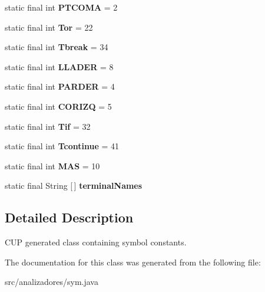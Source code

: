 \begin{DoxyCompactItemize}
static final int {\bfseries P\+T\+C\+O\+MA} = 2
\item 
\mbox{\label{classanalizadores_1_1sym_a633120b6b73f79c89c860adfaf8f8ea4}} 
static final int {\bfseries Tor} = 22
\item 
\mbox{\label{classanalizadores_1_1sym_a47dcd33c94d410877fbcca792bc5ee54}} 
static final int {\bfseries Tbreak} = 34
\item 
\mbox{\label{classanalizadores_1_1sym_ad63abef425c2b18dda1ccb959358e704}} 
static final int {\bfseries L\+L\+A\+D\+ER} = 8
\item 
\mbox{\label{classanalizadores_1_1sym_a02cdf13eb2481d97b0c8f5928cc74817}} 
static final int {\bfseries P\+A\+R\+D\+ER} = 4
\item 
\mbox{\label{classanalizadores_1_1sym_a79c3c0929cccad3c9ee7da492e3911f4}} 
static final int {\bfseries C\+O\+R\+I\+ZQ} = 5
\item 
\mbox{\label{classanalizadores_1_1sym_a33fbdc7b9b9054bb272c591dfd7ec3b6}} 
static final int {\bfseries Tif} = 32
\item 
\mbox{\label{classanalizadores_1_1sym_a3c58f13b33bd7e1673661d9c17fb02dd}} 
static final int {\bfseries Tcontinue} = 41
\item 
\mbox{\label{classanalizadores_1_1sym_aff7c3629c18bbb18dbf247bdc7819712}} 
static final int {\bfseries M\+AS} = 10
\item 
\mbox{\label{classanalizadores_1_1sym_a4ed81fab67983049691d8adffd882f90}} 
static final String \mbox{[}$\,$\mbox{]} {\bfseries terminal\+Names}
\end{DoxyCompactItemize}


\subsection{Detailed Description}
C\+UP generated class containing symbol constants. 

The documentation for this class was generated from the following file\+:\begin{DoxyCompactItemize}
\item 
src/analizadores/sym.\+java\end{DoxyCompactItemize}
